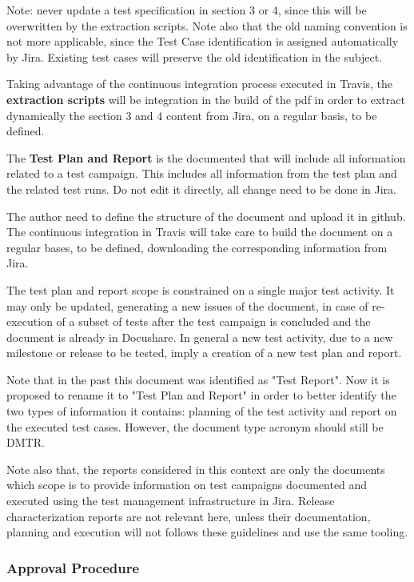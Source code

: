 Note: never update a test specification in section 3 or 4, since this will be overwritten by the extraction scripts. Note also that the old naming convention is not more applicable, since the Test Case identification is assigned automatically by Jira. Existing test cases will preserve the old identification in the subject.

Taking advantage of the continuous integration process executed in Travis, the {\bf extraction scripts} will be integration in the build of the pdf in order to extract dynamically the section 3 and 4 content from Jira, on a regular basis, to be defined.


The {\bf Test Plan and Report} is the documented that will include all information related to a test campaign. 
This includes all information from the test plan and the related test runs. 
Do not edit it directly, all change need to be done in Jira.

The author need to define the structure of the document and upload it in github. The continuous integration in Travis will take care to build the document on a regular bases, to be defined, downloading the corresponding information from Jira.

The test plan and report scope is constrained on a single major test activity. It may only be updated, generating a new issues of the document, in case of re-execution of a subset of tests after the test campaign is concluded and the document is already in Docushare.
In general a new test activity, due to a new milestone or release to be tested, imply a creation of a new test plan and report.

Note that in the past this document was identified as "Test Report".
Now it is proposed to rename it to "Test Plan and Report" in order to better identify the two types of information it contains: planning of the test activity and report on the executed test cases. However, the document type acronym should still be DMTR. 

Note also that, the reports considered in this context are only the documents which scope is to provide information on test campaigns documented and executed using the test management infrastructure in Jira. Release characterization reports are not relevant here, unless their documentation, planning and execution will not follows these guidelines and use the same tooling.


\subsubsection{Approval Procedure}

